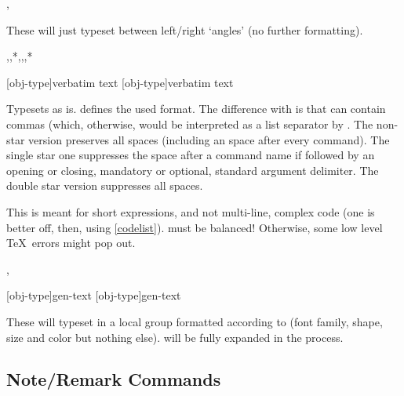 \documentclass{article}
\begin{document}
\begin{codedescribe}[code]{\typesetmeta,\tsmeta}
\begin{codesyntax}
\end{codesyntax}
 These will just typeset  between left/right `angles' (no further formatting).
 
\end{codedescribe}


\begin{codedescribe}[code,update=2026/02/13]{\typesetverb,\typesetverb*,\typesetverb**,\tsverb,\tsverb*,\tsverb**}
\begin{codesyntax}
\tsmacro{\typesetverb}[obj-type]{verbatim text}
\tsmacro{\tsverb}[obj-type]{verbatim text}
\end{codesyntax}
 Typesets  as is.  defines the used format. The difference with  is that  can contain commas (which, otherwise, would be interpreted as a list separator by \tsobj{\tsobj}. The non-star version preserves all spaces (including an space after every command). The single star one suppresses the space after a command name if followed by an opening  or closing, mandatory or optional, standard argument delimiter. The double star version suppresses all spaces.
\begin{tsremark}
This is meant for short expressions, and not multi-line, complex code (one is better off, then, using \ref{codelist}).   must be balanced! Otherwise, some low level \TeX\ errors might  pop out.
\end{tsremark}
\end{codedescribe}

\begin{codedescribe}[code,new=2026/02/13]{\typesetfmt,\tsfmt}
\begin{codesyntax}
\tsmacro{\typesetfmt}[obj-type]{gen-text}
\tsmacro{\tsfmt}[obj-type]{gen-text}
\end{codesyntax}
 These will typeset  in a local group formatted  according to  (font family, shape, size and color but nothing else).  will be fully expanded in the process.
\end{codedescribe}



\subsection{Note/Remark Commands}\label{note-commands}
\end{document}
